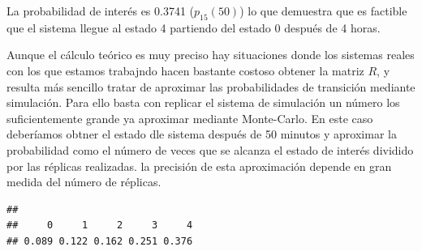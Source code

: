 \documentclass[
]{book}
\newenvironment{Shaded}{\begin{snugshade}}{\end{snugshade}}
\newcommand{\AttributeTok}[1]{\textcolor[rgb]{0.77,0.63,0.00}{#1}}
\newcommand{\CommentTok}[1]{\textcolor[rgb]{0.56,0.35,0.01}{\textit{#1}}}
\newcommand{\ControlFlowTok}[1]{\textcolor[rgb]{0.13,0.29,0.53}{\textbf{#1}}}
\newcommand{\DecValTok}[1]{\textcolor[rgb]{0.00,0.00,0.81}{#1}}
\newcommand{\FunctionTok}[1]{\textcolor[rgb]{0.00,0.00,0.00}{#1}}
\newcommand{\NormalTok}[1]{#1}
\newcommand{\OtherTok}[1]{\textcolor[rgb]{0.56,0.35,0.01}{#1}}
\newcommand{\SpecialCharTok}[1]{\textcolor[rgb]{0.00,0.00,0.00}{#1}}
\theoremstyle{definition}
\theoremstyle{definition}
\theoremstyle{definition}
\theoremstyle{definition}
\theoremstyle{remark}
\begin{document}
La probabilidad de interés es 0.3741 (\(p_{15}(50)\)) lo que demuestra que es factible que el sistema llegue al estado 4 partiendo del estado 0 después de 4 horas.

Aunque el cálculo teórico es muy preciso hay situaciones donde los sistemas reales con los que estamos trabajndo hacen bastante costoso obtener la matriz \(R\), y resulta más sencillo tratar de aproximar las probabilidades de transición mediante simulación. Para ello basta con replicar el sistema de simulación un número los suficientemente grande ya aproximar mediante Monte-Carlo. En este caso deberíamos obtner el estado dle sistema después de 50 minutos y aproximar la probabilidad como el número de veces que se alcanza el estado de interés dividido por las réplicas realizadas. la precisión de esta aproximación depende en gran medida del número de réplicas.

\begin{Shaded}
\end{Shaded}

\begin{verbatim}
## 
##     0     1     2     3     4 
## 0.089 0.122 0.162 0.251 0.376
\end{verbatim}
\end{document}
